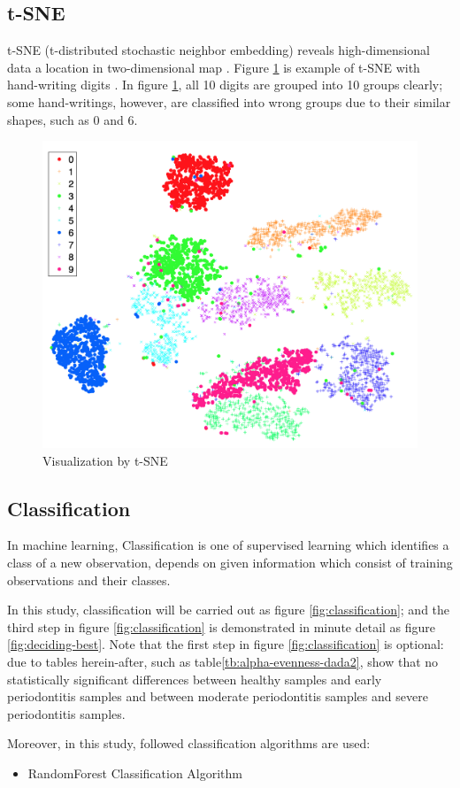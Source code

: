 \documentclass[a4paper]{article}
\begin{document}
        \subsection{t-SNE}
            t-SNE (t-distributed stochastic neighbor embedding) reveals high-dimensional data a location in two-dimensional map \cite{tSNE1}. Figure \ref{fig:tsne-example} is example of t-SNE with hand-writing digits \cite{tSNE1}. In figure \ref{fig:tsne-example}, all 10 digits are grouped into 10 groups clearly; some hand-writings, however, are classified into wrong groups due to their similar shapes, such as 0 and 6.

            \begin{figure}[p]
                \centering
                \includegraphics[width=0.4 \linewidth]{figures/tSNE.png}
                \caption{Visualization by t-SNE \protect\cite{tSNE1}}
                \label{fig:tsne-example}
            \end{figure}

        \subsection{Classification}
            In machine learning, Classification is one of supervised learning which identifies a class of a new observation, depends on given information which consist of training observations and their classes.

            In this study, classification will be carried out as figure \ref{fig:classification}; and the third step in figure \ref{fig:classification} is demonstrated in minute detail as figure \ref{fig:deciding-best}. Note that the first step in figure \ref{fig:classification} is optional: due to tables herein-after, such as table\ref{tb:alpha-evenness-dada2}, show that no statistically significant differences between healthy samples and early periodontitis samples and between moderate periodontitis samples and severe periodontitis samples.

            Moreover, in this study, followed classification algorithms are used:
            \begin{itemize}
                \item RandomForest Classification Algorithm \cite{RandomForest1, sklearn1}
            \end{itemize}
\end{document}
